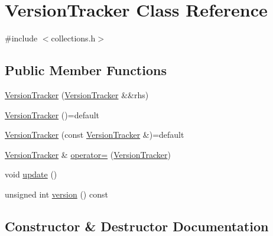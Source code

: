 \hypertarget{classstanfordcpplib_1_1collections_1_1VersionTracker}{}\section{Version\+Tracker Class Reference}
\label{classstanfordcpplib_1_1collections_1_1VersionTracker}


{\ttfamily \#include $<$collections.\+h$>$}

\subsection*{Public Member Functions}
\begin{DoxyCompactItemize}
\item 
\mbox{\hyperlink{classstanfordcpplib_1_1collections_1_1VersionTracker_a26aac3821d8a7055278b684b6a245a28}{Version\+Tracker}} (\mbox{\hyperlink{classstanfordcpplib_1_1collections_1_1VersionTracker}{Version\+Tracker}} \&\&rhs)
\item 
\mbox{\hyperlink{classstanfordcpplib_1_1collections_1_1VersionTracker_a2ce3fb8b9ecc5cfc66e61166e8d1c186}{Version\+Tracker}} ()=default
\item 
\mbox{\hyperlink{classstanfordcpplib_1_1collections_1_1VersionTracker_a643cf90c10dd9015549e6e4036e033b2}{Version\+Tracker}} (const \mbox{\hyperlink{classstanfordcpplib_1_1collections_1_1VersionTracker}{Version\+Tracker}} \&)=default
\item 
\mbox{\hyperlink{classstanfordcpplib_1_1collections_1_1VersionTracker}{Version\+Tracker}} \& \mbox{\hyperlink{classstanfordcpplib_1_1collections_1_1VersionTracker_ac51e57b0ed661391c4dfc56265dd969d}{operator=}} (\mbox{\hyperlink{classstanfordcpplib_1_1collections_1_1VersionTracker}{Version\+Tracker}})
\item 
void \mbox{\hyperlink{classstanfordcpplib_1_1collections_1_1VersionTracker_ac5c54df7ed3b930268c8d7752c101725}{update}} ()
\item 
unsigned int \mbox{\hyperlink{classstanfordcpplib_1_1collections_1_1VersionTracker_a0aa696ccb72cbf928535d6b646bac1aa}{version}} () const
\end{DoxyCompactItemize}


\subsection{Constructor \& Destructor Documentation}
\mbox{\label{classstanfordcpplib_1_1collections_1_1VersionTracker_a26aac3821d8a7055278b684b6a245a28}} 
